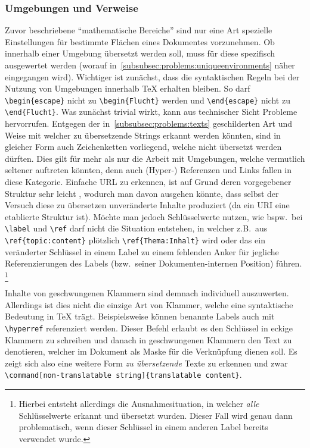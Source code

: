\subsubsection{Umgebungen und Verweise}%
Zuvor beschriebene \enquote{mathematische Bereiche} sind nur eine Art spezielle Einstellungen für bestimmte Flächen eines Dokumentes vorzunehmen. Ob innerhalb einer Umgebung übersetzt werden soll, muss für diese spezifisch ausgewertet werden (worauf in~\ref{subsubsec:problems:uniqueenvironments} näher eingegangen wird). Wichtiger ist zunächst, dass die syntaktischen Regeln bei der Nutzung von Umgebungen innerhalb \TeX{} erhalten bleiben. So darf \verb|\begin{escape}| nicht zu \verb|\begin{Flucht}| werden und \verb|\end{escape}| nicht zu \verb|\end{Flucht}|. 
Was zunächst trivial wirkt, kann aus technischer Sicht Probleme hervorrufen. Entgegen der in~\ref{subsubsec:problems:texts} geschilderten Art und Weise mit welcher zu übersetzende Strings erkannt werden könnten, sind in gleicher Form auch Zeichenketten vorliegend, welche nicht übersetzt werden dürften. Dies gilt für mehr als nur die Arbeit mit Umgebungen, welche vermutlich seltener auftreten könnten, denn auch (Hyper-) Referenzen und Links fallen in diese Kategorie. Einfache URL zu erkennen, ist auf Grund deren vorgegebener Struktur sehr leicht 
, wodurch man davon ausgehen könnte, dass selbst der Versuch diese zu übersetzen unveränderte Inhalte produziert (da ein URI eine etablierte Struktur ist). Möchte man jedoch Schlüsselwerte nutzen, wie bspw.\ bei \verb|\label| und \verb|\ref| darf nicht die Situation entstehen, in welcher z.B.\ aus \verb|\ref{topic:content}| plötzlich \verb|\ref{Thema:Inhalt}| wird oder das ein veränderter Schlüssel in einem Label zu einem fehlenden Anker für jegliche Referenzierungen des Labels (bzw.\ seiner Dokumenten-internen Position) führen.
\footnote{Hierbei entsteht allerdings die Ausnahmesituation, in welcher \textit{alle} Schlüsselwerte erkannt und übersetzt wurden. Dieser Fall wird genau dann problematisch, wenn dieser Schlüssel in einem anderen Label bereits verwendet wurde.}

Inhalte von geschwungenen Klammern sind demnach individuell auszuwerten. Allerdings ist dies nicht die einzige Art von Klammer, welche eine syntaktische Bedeutung in \TeX{} trägt. Beispielsweise können benannte Labels auch mit \verb|\hyperref| referenziert werden. Dieser Befehl erlaubt es den Schlüssel in eckige Klammern zu schreiben und danach in geschwungenen Klammern den Text zu denotieren, welcher im Dokument als Maske für die Verknüpfung dienen soll. 
Es zeigt sich also eine weitere Form \textit{zu übersetzende} Texte zu erkennen und zwar \verb|\command[non-translatable string]{translatable content}|.


